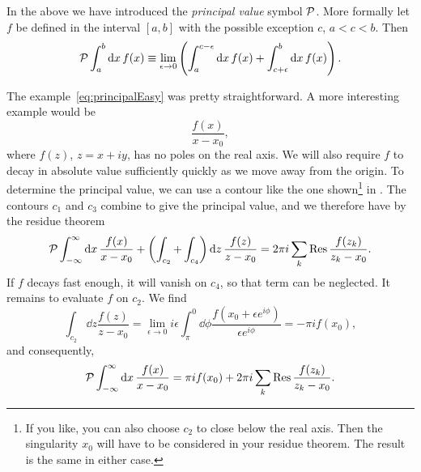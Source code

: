 In the above we have introduced the {\it principal value}
symbol $\mathcal{P}$. More formally let $f$ be defined in the interval $[a,b]$
with the possible exception $c$, $a<c<b$. Then 
\begin{equation}
  \mathcal{P}\int_a^b\dd{x}f(x)\equiv\lim_{\epsilon\to0}
     \left(\int_a^{c-\epsilon}\dd{x}f(x)+\int_{c+\epsilon}^b\dd{x}f(x)\right).
\end{equation}

The example~\eqref{eq:principalEasy} was pretty straightforward. A more
interesting example would be
\begin{equation}
  \frac{f(x)}{x-x_0},
\end{equation}
where $f(z)$, $z=x+iy$, has no poles on the real axis. We will also require $f$
to decay in absolute value sufficiently quickly as we move away from the origin.
To determine the principal value, we can use a contour like the one
shown\footnote{If you like, you can also choose $c_2$ to close below the real
axis. Then the singularity $x_0$ will have to be considered in your residue
theorem. The result is the same in either case.}
in . The contours $c_1$ and $c_3$ combine to give
the principal value, and we therefore have by the residue theorem
\begin{equation}
  \principal\int_{-\infty}^{\infty}\dd{x}\frac{f(x)}{x-x_0}
   +\left(\int_{c_2}+\int_{c_4}\right)\dd{z}\frac{f(z)}{z-x_0}
   =2\pi i\sum_k\Res \frac{f(z_k)}{z_k-x_0}. 
\end{equation}
If $f$ decays fast enough, it will vanish on $c_4$, so that term can be
neglected. It remains to evaluate $f$ on $c_2$. We find
\begin{equation}
 \int_{c_2}\dd{z}\frac{f(z)}{z-x_0}
  =\lim_{\epsilon\to0}i\epsilon\int_\pi^0\dd{\phi}
      \frac{f(x_0+\epsilon e^{i\phi})}{\epsilon e^{i\phi}}=-\pi i f(x_0),
\end{equation}
and consequently,
\begin{equation}
  \principal\int_{-\infty}^{\infty}\dd{x}\frac{f(x)}{x-x_0}
   =\pi i f(x_0)+2\pi i\sum_k\Res \frac{f(z_k)}{z_k-x_0}. 
\end{equation}

